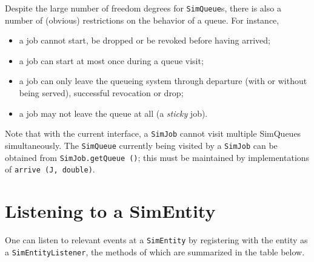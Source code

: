 \documentclass[12pt]{book}
\begin{document}
Despite the large number of freedom degrees for \lstinline-SimQueue-s,
  there is also a number of (obvious) restrictions on the behavior of a queue.
For instance,
\begin{itemize}
  \item a job cannot start, be dropped or be revoked before having arrived;
  \item a job can start at most once during a queue visit;
  \item a job can only leave the queueing system through departure (with or without being served),
        successful revocation or drop; 
  \item a job may not leave the queue at all (a {\em sticky\/} job).
\end{itemize}
Note that with the current interface, a \lstinline|SimJob| cannot visit multiple SimQueues simultaneously.
The \lstinline|SimQueue| currently being visited by a \lstinline|SimJob|
  can be obtained from \lstinline|SimJob.getQueue ()|;
  this must be maintained by implementations of \lstinline|arrive (J, double)|.

\section{Listening to a SimEntity}

One can listen to relevant events at a \lstinline|SimEntity| by registering with the entity
  as a \lstinline|SimEntityListener|, the methods of which are summarized in the table below.
\end{document}

